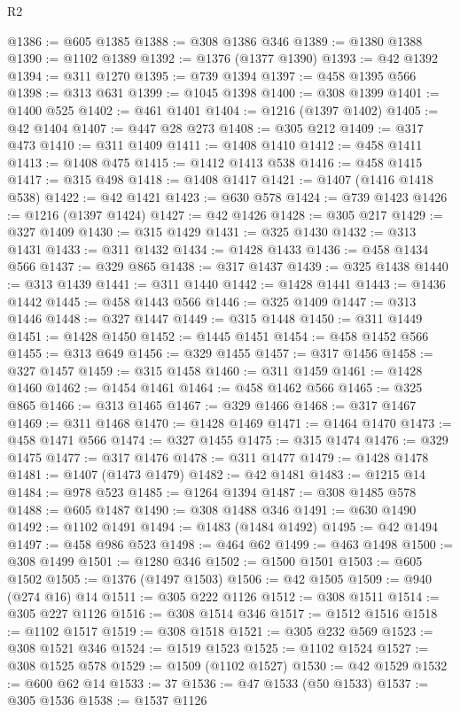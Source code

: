\begin{lexlean}{R2}
\begin{coremodule}
@1386 := @605 @1385
@1388 := @308 @1386 @346
@1389 := @1380 @1388
@1390 := @1102 @1389
@1392 := @1376 (@1377 @1390)
@1393 := @42 @1392
@1394 := @311 @1270
@1395 := @739 @1394
@1397 := @458 @1395 @566
@1398 := @313 @631
@1399 := @1045 @1398
@1400 := @308 @1399
@1401 := @1400 @525
@1402 := @461 @1401
@1404 := @1216 (@1397 @1402)
@1405 := @42 @1404
@1407 := @447 @28 @273
@1408 := @305 @212
@1409 := @317 @473
@1410 := @311 @1409
@1411 := @1408 @1410
@1412 := @458 @1411
@1413 := @1408 @475
@1415 := @1412 @1413 @538
@1416 := @458 @1415
@1417 := @315 @498
@1418 := @1408 @1417
@1421 := @1407 (@1416 @1418 @538)
@1422 := @42 @1421
@1423 := @630 @578
@1424 := @739 @1423
@1426 := @1216 (@1397 @1424)
@1427 := @42 @1426
@1428 := @305 @217
@1429 := @327 @1409
@1430 := @315 @1429
@1431 := @325 @1430
@1432 := @313 @1431
@1433 := @311 @1432
@1434 := @1428 @1433
@1436 := @458 @1434 @566
@1437 := @329 @865
@1438 := @317 @1437
@1439 := @325 @1438
@1440 := @313 @1439
@1441 := @311 @1440
@1442 := @1428 @1441
@1443 := @1436 @1442
@1445 := @458 @1443 @566
@1446 := @325 @1409
@1447 := @313 @1446
@1448 := @327 @1447
@1449 := @315 @1448
@1450 := @311 @1449
@1451 := @1428 @1450
@1452 := @1445 @1451
@1454 := @458 @1452 @566
@1455 := @313 @649
@1456 := @329 @1455
@1457 := @317 @1456
@1458 := @327 @1457
@1459 := @315 @1458
@1460 := @311 @1459
@1461 := @1428 @1460
@1462 := @1454 @1461
@1464 := @458 @1462 @566
@1465 := @325 @865
@1466 := @313 @1465
@1467 := @329 @1466
@1468 := @317 @1467
@1469 := @311 @1468
@1470 := @1428 @1469
@1471 := @1464 @1470
@1473 := @458 @1471 @566
@1474 := @327 @1455
@1475 := @315 @1474
@1476 := @329 @1475
@1477 := @317 @1476
@1478 := @311 @1477
@1479 := @1428 @1478
@1481 := @1407 (@1473 @1479)
@1482 := @42 @1481
@1483 := @1215 @14
@1484 := @978 @523
@1485 := @1264 @1394
@1487 := @308 @1485 @578
@1488 := @605 @1487
@1490 := @308 @1488 @346
@1491 := @630 @1490
@1492 := @1102 @1491
@1494 := @1483 (@1484 @1492)
@1495 := @42 @1494
@1497 := @458 @986 @523
@1498 := @464 @62
@1499 := @463 @1498
@1500 := @308 @1499
@1501 := @1280 @346
@1502 := @1500 @1501
@1503 := @605 @1502
@1505 := @1376 (@1497 @1503)
@1506 := @42 @1505
@1509 := @940 (@274 @16) @14
@1511 := @305 @222 @1126
@1512 := @308 @1511
@1514 := @305 @227 @1126
@1516 := @308 @1514 @346
@1517 := @1512 @1516
@1518 := @1102 @1517
@1519 := @308 @1518
@1521 := @305 @232 @569
@1523 := @308 @1521 @346
@1524 := @1519 @1523
@1525 := @1102 @1524
@1527 := @308 @1525 @578
@1529 := @1509 (@1102 @1527)
@1530 := @42 @1529
@1532 := @600 @62 @14
@1533 := 37
@1536 := @47 @1533 (@50 @1533)
@1537 := @305 @1536
@1538 := @1537 @1126

\end{coremodule}
\end{lexlean}
